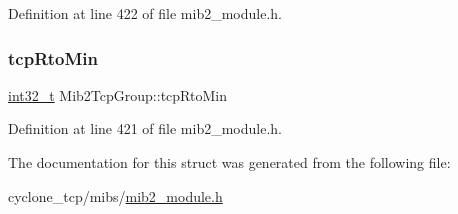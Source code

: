 Definition at line 422 of file mib2\+\_\+module.\+h.

\mbox{\label{structMib2TcpGroup_a0e760e3fd82783b29274022c35eb293b}} 
\subsubsection{\texorpdfstring{tcp\+Rto\+Min}{tcpRtoMin}}
{\footnotesize\ttfamily \hyperlink{stdint_8h_ab1967d8591af1a4e48c37fd2b0f184d0}{int32\+\_\+t} Mib2\+Tcp\+Group\+::tcp\+Rto\+Min}



Definition at line 421 of file mib2\+\_\+module.\+h.



The documentation for this struct was generated from the following file\+:\begin{DoxyCompactItemize}
\item 
cyclone\+\_\+tcp/mibs/\hyperlink{mib2__module_8h}{mib2\+\_\+module.\+h}\end{DoxyCompactItemize}
